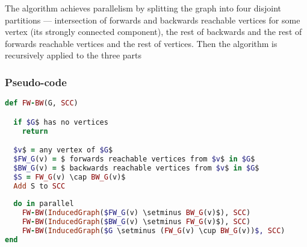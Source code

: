 \documentclass{report}
\theoremstyle{plain}
\theoremstyle{definition}
\theoremstyle{remark}
\numberwithin{definition}{chapter}
\numberwithin{example}{chapter}
\numberwithin{figure}{chapter}
\numberwithin{theorem}{chapter}
\numberwithin{lemma}{chapter}
\begin{document}
The algorithm achieves parallelism by splitting the graph into four disjoint partitions --- intersection of forwards and backwards reachable vertices for some vertex (its strongly connected component), the rest of backwards and the rest of forwards reachable vertices and the rest of vertices. Then the algorithm is recursively applied to the three parts

\subsubsection*{Pseudo-code}

\begin{lstlisting}[language=Ruby, mathescape]
def FW-BW(G, SCC)

  if $G$ has no vertices
    return

  $v$ = any vertex of $G$
  $FW_G(v) = $ forwards reachable vertices from $v$ in $G$
  $BW_G(v) = $ backwards reachable vertices from $v$ in $G$
  $S = FW_G(v) \cap BW_G(v)$
  Add S to SCC
  
  do in parallel
    FW-BW(InducedGraph($FW_G(v) \setminus BW_G(v)$), SCC)
    FW-BW(InducedGraph($BW_G(v) \setminus FW_G(v)$), SCC)
    FW-BW(InducedGraph($G \setminus (FW_G(v) \cup BW_G(v))$, SCC)
end
\end{lstlisting}
\end{document}
